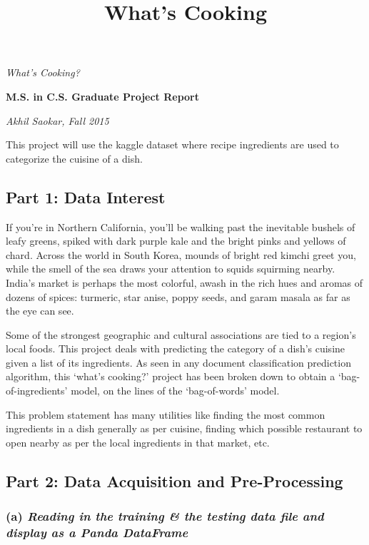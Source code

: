 \documentclass{article}
\title{What's Cooking}
\begin{document}
    
    
    \maketitle
    
    

    
    \emph{What's Cooking?}

\textbf{M.S. in C.S. Graduate Project Report}

\emph{Akhil Saokar, Fall 2015}

This project will use the kaggle dataset where recipe ingredients are
used to categorize the cuisine of a dish.

    \subsection{Part 1: Data Interest}\label{part-1-data-interest}

    If you're in Northern California, you'll be walking past the inevitable
bushels of leafy greens, spiked with dark purple kale and the bright
pinks and yellows of chard. Across the world in South Korea, mounds of
bright red kimchi greet you, while the smell of the sea draws your
attention to squids squirming nearby. India's market is perhaps the most
colorful, awash in the rich hues and aromas of dozens of spices:
turmeric, star anise, poppy seeds, and garam masala as far as the eye
can see.

Some of the strongest geographic and cultural associations are tied to a
region's local foods. This project deals with predicting the category of
a dish's cuisine given a list of its ingredients. As seen in any
document classification prediction algorithm, this `what's cooking?'
project has been broken down to obtain a `bag-of-ingredients' model, on
the lines of the `bag-of-words' model.

This problem statement has many utilities like finding the most common
ingredients in a dish generally as per cuisine, finding which possible
restaurant to open nearby as per the local ingredients in that market,
etc.

    \subsection{Part 2: Data Acquisition and
Pre-Processing}\label{part-2-data-acquisition-and-pre-processing}

    \subsubsection{\texorpdfstring{(a) \emph{Reading in the training \& the
testing data file and display as a Panda
DataFrame}}{(a) Reading in the training \& the testing data file and display as a Panda DataFrame}}\label{a-reading-in-the-training-the-testing-data-file-and-display-as-a-panda-dataframe}
\end{document}
